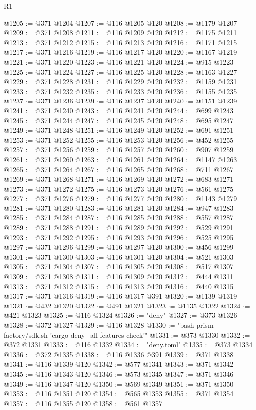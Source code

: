 \begin{lexlean}{R1}
\begin{coremodule}
@1205 := @371 @1204
@1207 := @116 @1205 @120
@1208 := @1179 @1207
@1209 := @371 @1208
@1211 := @116 @1209 @120
@1212 := @1175 @1211
@1213 := @371 @1212
@1215 := @116 @1213 @120
@1216 := @1171 @1215
@1217 := @371 @1216
@1219 := @116 @1217 @120
@1220 := @1167 @1219
@1221 := @371 @1220
@1223 := @116 @1221 @120
@1224 := @915 @1223
@1225 := @371 @1224
@1227 := @116 @1225 @120
@1228 := @1163 @1227
@1229 := @371 @1228
@1231 := @116 @1229 @120
@1232 := @1159 @1231
@1233 := @371 @1232
@1235 := @116 @1233 @120
@1236 := @1155 @1235
@1237 := @371 @1236
@1239 := @116 @1237 @120
@1240 := @1151 @1239
@1241 := @371 @1240
@1243 := @116 @1241 @120
@1244 := @699 @1243
@1245 := @371 @1244
@1247 := @116 @1245 @120
@1248 := @695 @1247
@1249 := @371 @1248
@1251 := @116 @1249 @120
@1252 := @691 @1251
@1253 := @371 @1252
@1255 := @116 @1253 @120
@1256 := @452 @1255
@1257 := @371 @1256
@1259 := @116 @1257 @120
@1260 := @907 @1259
@1261 := @371 @1260
@1263 := @116 @1261 @120
@1264 := @1147 @1263
@1265 := @371 @1264
@1267 := @116 @1265 @120
@1268 := @711 @1267
@1269 := @371 @1268
@1271 := @116 @1269 @120
@1272 := @683 @1271
@1273 := @371 @1272
@1275 := @116 @1273 @120
@1276 := @561 @1275
@1277 := @371 @1276
@1279 := @116 @1277 @120
@1280 := @1143 @1279
@1281 := @371 @1280
@1283 := @116 @1281 @120
@1284 := @947 @1283
@1285 := @371 @1284
@1287 := @116 @1285 @120
@1288 := @557 @1287
@1289 := @371 @1288
@1291 := @116 @1289 @120
@1292 := @529 @1291
@1293 := @371 @1292
@1295 := @116 @1293 @120
@1296 := @525 @1295
@1297 := @371 @1296
@1299 := @116 @1297 @120
@1300 := @456 @1299
@1301 := @371 @1300
@1303 := @116 @1301 @120
@1304 := @521 @1303
@1305 := @371 @1304
@1307 := @116 @1305 @120
@1308 := @517 @1307
@1309 := @371 @1308
@1311 := @116 @1309 @120
@1312 := @444 @1311
@1313 := @371 @1312
@1315 := @116 @1313 @120
@1316 := @440 @1315
@1317 := @371 @1316
@1319 := @116 @1317 @391
@1320 := @1139 @1319
@1321 := @432 @1320
@1322 := @491 @1321
@1323 := @1135 @1322
@1324 := @421 @1323
@1325 := @116 @1324
@1326 := "deny"
@1327 := @373 @1326
@1328 := @372 @1327
@1329 := @116 @1328
@1330 := "bash prism-factory/sdk.sh 'cargo deny --all-features check'"
@1331 := @373 @1330
@1332 := @372 @1331
@1333 := @116 @1332
@1334 := "deny.toml"
@1335 := @373 @1334
@1336 := @372 @1335
@1338 := @116 @1336 @391
@1339 := @371 @1338
@1341 := @116 @1339 @120
@1342 := @577 @1341
@1343 := @371 @1342
@1345 := @116 @1343 @120
@1346 := @573 @1345
@1347 := @371 @1346
@1349 := @116 @1347 @120
@1350 := @569 @1349
@1351 := @371 @1350
@1353 := @116 @1351 @120
@1354 := @565 @1353
@1355 := @371 @1354
@1357 := @116 @1355 @120
@1358 := @561 @1357

\end{coremodule}
\end{lexlean}
